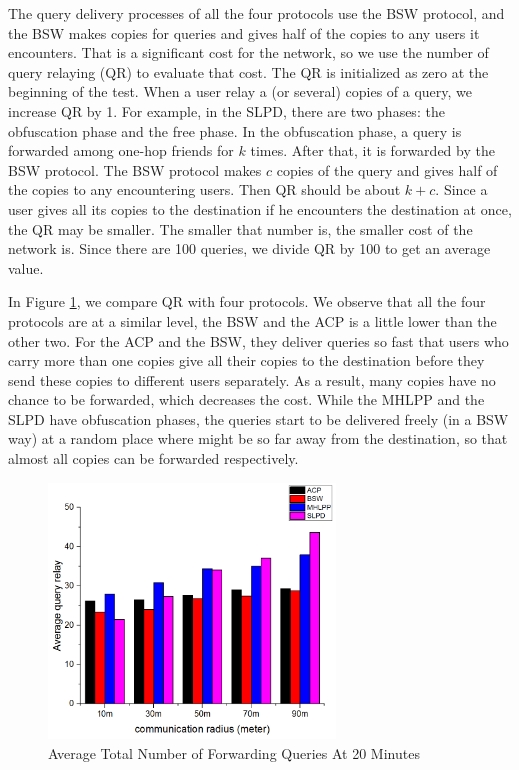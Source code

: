 \documentclass[conference]{IEEEtran}
\begin{document}
\noindent The query delivery processes of all the four protocols use the BSW protocol, and the BSW makes copies for queries and gives half of the copies to any users it encounters. That is a significant cost for the network, so we use the number of query relaying (QR) to evaluate that cost. The QR is initialized as zero at the beginning of the test. When a user relay a (or several) copies of a query, we increase QR by 1. For example, in the SLPD, there are two phases: the obfuscation phase and the free phase. In the obfuscation phase, a query is forwarded among one-hop friends for $k$ times. After that, it is forwarded by the BSW protocol. The BSW protocol makes $c$ copies of the query and gives half of the copies to any encountering users. Then QR should be about $k+c$. Since a user gives all its copies to the destination if he encounters the destination at once, the QR may be smaller. The smaller that number is, the smaller cost of the network is. Since there are 100 queries, we divide QR by 100 to get an average value. 

In Figure \ref{fig:F418AverageTotalNumberofForwardingQueriesAt20Minutes}, we compare QR with four protocols. We observe that all the four protocols are at a similar level, the BSW and the ACP is a little lower than the other two. For the ACP and the BSW, they deliver queries so fast that users who carry more than one copies give all their copies to the destination before they send these copies to different users separately. As a result, many copies have no chance to be forwarded, which decreases the cost. While the MHLPP and the SLPD have obfuscation phases, the queries start to be delivered freely (in a BSW way) at a random place where might be so far away from the destination, so that almost all copies can be forwarded respectively.

\begin{figure} [hbtp]
  \centering 
  \includegraphics[width=3in]{figures/F418AverageTotalNumberofForwardingQueriesAt20Minutes.png}
  \caption{Average Total Number of Forwarding Queries At 20 Minutes} 
  \label{fig:F418AverageTotalNumberofForwardingQueriesAt20Minutes} %
\end{figure}
\end{document}
